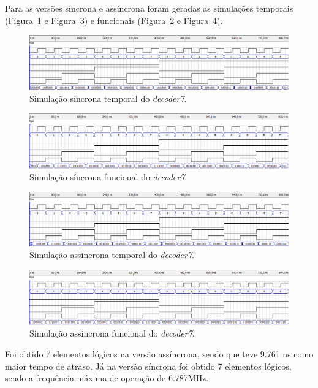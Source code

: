 \documentclass[12pt]{article}
\begin{document}
Para as versões síncrona e assíncrona foram geradas as simulações temporais (Figura~\ref{fig:ex1st} e Figura~\ref{fig:ex1ast}) e funcionais (Figura~\ref{fig:ex1sf} e Figura~\ref{fig:ex1asf}).

\begin{figure}[H]
	\centering
	\includegraphics[width=.8\textwidth]{ex1_st.png}
	\caption{Simulação síncrona temporal do \textit{decoder7}.}
	\label{fig:ex1st}
\end{figure}

\begin{figure}[H]
	\centering
	\includegraphics[width=.8\textwidth]{ex1_sf.png}
	\caption{Simulação síncrona funcional do \textit{decoder7}.}
	\label{fig:ex1sf}
\end{figure}

\begin{figure}[H]
	\centering
	\includegraphics[width=.8\textwidth]{ex1_ast.png}
	\caption{Simulação assíncrona temporal do \textit{decoder7}.}
	\label{fig:ex1ast}
\end{figure}

\begin{figure}[H]
	\centering
	\includegraphics[width=.8\textwidth]{ex1_asf.png}
	\caption{Simulação assíncrona funcional do \textit{decoder7}.}
	\label{fig:ex1asf}
\end{figure}

Foi obtido 7 elementos lógicos na versão assíncrona, sendo que teve 9.761 ns como maior tempo de atraso. Já na versão síncrona foi obtido 7 elementos lógicos, sendo a frequência máxima de operação de 6.787MHz.
\end{document}
